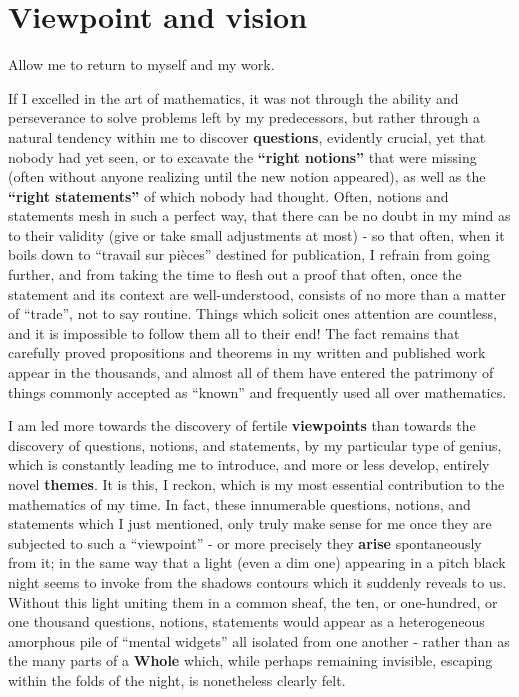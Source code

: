\section{Viewpoint and vision}

Allow me to return to myself and my work.

If I excelled in the art of mathematics,
it was not through the ability and perseverance to solve problems left by my predecessors,
but rather through a natural tendency within me to 
discover \textbf{questions},
evidently crucial, yet that nobody had yet seen, or to excavate the \textbf{``right notions''}
that were missing
(often without anyone realizing until the new notion appeared), as well as the
\textbf{``right statements''} of which nobody had thought.
Often, notions and statements mesh in such a perfect way, that there can be no doubt in my
mind as to their validity (give or take small adjustments at most) - so that often, when
it boils down to ``travail sur pi\`eces'' destined for publication, I refrain from going
further, and from taking the time to flesh out a proof that often, once the statement and
its context are well-understood, consists of no more than a matter of ``trade'', not to
say routine.
Things which solicit ones attention are countless, and it is impossible to follow 
them all to their end! 
The fact remains that carefully proved propositions and theorems in my written and
published work appear in the thousands, and almost all of them have entered the 
patrimony of things commonly accepted as ``known'' and frequently used all over
mathematics.

I am led more towards the discovery of
fertile \textbf{viewpoints} 
than towards the discovery of questions, notions, and statements, by my particular type of
genius, which is constantly leading me to introduce, and more or
less develop, entirely novel \textbf{themes}. 
It is this, I reckon, which is my most essential contribution to the mathematics of my time.
In fact, these innumerable questions, notions, and statements which I just mentioned, only
truly make sense for me once they are subjected to such a ``viewpoint'' - or more
precisely they \textbf{arise} spontaneously from it; in the same way that a light (even a
dim one) appearing in a pitch black night seems to invoke from the shadows
contours which it suddenly reveals to us.
Without this light 
uniting them in a common sheaf, the ten, or one-hundred, or one thousand questions,
notions, statements would appear as a heterogeneous amorphous pile of 
``mental widgets'' all isolated from one another - 
rather than as the many parts of a
\textbf{Whole} which, while perhaps remaining invisible, 
escaping within the folds of the night,
is nonetheless clearly felt.

